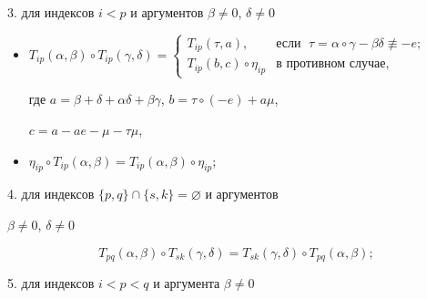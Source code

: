  


3. для индексов $i<p$ и аргументов $\beta\ne0$, $\delta\ne0$ 


\begin{itemize} 


\item[a)] $T_{ip}(\alpha,\beta)\circ T_{ip}(\gamma,\delta)= 


\begin{cases} 


T_{ip}(\tau,a),&\text{если }\; \tau=\alpha\circ\gamma- \beta\delta 


\not\equiv-e;\\ 


T_{ip}(b,c)\circ\eta_{ip}& \text{в противном случае},


\end{cases}$ \newline


где $a=\beta+\delta+\alpha\delta+\beta\gamma$, $b=\tau\circ(-e)+a\mu$, 


$c=a-a e-\mu-\tau\mu$, 


\item[b)] $\eta_{ip}\circ T_{ip}(\alpha,\beta)=T_{ip}(\alpha,\beta) 


\circ\eta_{ip}$; 


\end{itemize} 


 


4. для индексов $\{p,q\}\cap\{s,k\}=\varnothing$ и аргументов 


$\beta\ne0$, $\delta\ne0$


$$


T_{pq}(\alpha,\beta)\circ 


T_{sk}(\gamma,\delta)=T_{sk}(\gamma,\delta)\circ T_{pq}(\alpha,\beta); 


$$ 





5. для индексов $i<p<q$ и аргумента $\beta\ne0$ 


